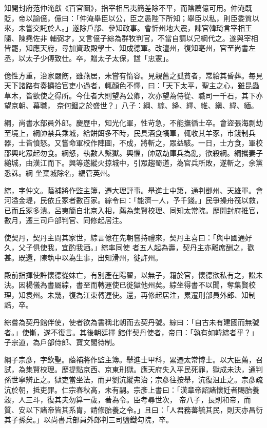 \begin{pinyinscope}
 知開封府范仲淹獻《百官圖》，指宰相呂夷簡差除不平，而陰薦億可用。仲淹既貶，帝以諭億，億曰：「仲淹舉臣以公，臣之愚陛下所知；舉臣以私，則臣委質以來，未嘗交託於人。」遂除戶部、參知政事。會忻州地大震，諫官韓琦言宰相王隨、陳堯佐非
 輔弼才，又言億子綜為群牧判官，不當自請以兄綱代之。遂與宰相皆罷，知應天府，尋加資政殿學士、知成德軍。改澶州，復知亳州，官至尚書左丞，以太子少傅致仕。卒，贈太子太保，諡「忠憲」。



 億性方重，治家嚴飭，雖燕居，未嘗有惰容。見親舊之孤貧者，常給其昏葬。每見天下諸路有奏攟拾官吏小過者，輒顏色不懌，曰：「天下太平，聖主之心，雖昆蟲草木，皆欲使之得所。今仕者大則望為公卿，次亦望為侍從、職司一千石，其下亦望京朝、幕職，
 奈何錮之於盛世？」八子：綱、綜、絳、繹、維、縝、緯、緬。



 綱，尚書水部員外郎。慶歷中，知光化軍，性苛急，不能撫循士卒。會盜張海剽劫至境上，綱帥禁兵乘城，給餅餌多不時，民具酒食犒軍，輒收其羊豕，市錢制兵器，士皆憤怒。又嘗命軍校作陣圖，不成，將斬之，眾益駭。一日，士方食，軍校邵興叱眾起勿食。綱怒，執數人繫獄。興懼，帥眾劫庫兵為亂，欲殺綱。綱攜妻子縋城，由漢江而下。興等遂縱火掠城中，引眾趨蜀道，為官兵所敗，遂斬之，余黨悉誅。綱
 坐棄城除名，編管英州。



 綜，字仲文。蔭補將作監主簿，遷大理評事。舉進士中第，通判鄧州、天雄軍。會河溢金堤，民依丘冢者數百家。綜令曰：「能濟一人，予千錢。」民爭操舟筏以救，已而丘冢多潰。呂夷簡自北京入相，薦為集賢校理、同知太常院。歷開封府推官，數月，遷三司戶部判官、同修起居注。



 使契丹，契丹主問其家世，綜言億在先朝嘗持禮來，契丹主喜曰：「與中國通好久，父子俱使我，宜酌我酒。」綜率同使
 者五人起為壽，契丹主亦離席酬之，歡甚。既還，陳執中以為生事，出知滑州，徙許州。



 殿前指揮使許懷德從妹亡，有別產在陽翟，以無子，籍於官，懷德欲私有之，訟未決。因楊儀為書屬綜，書至而轉運使已徙獄他州矣。綜坐得書不以聞，奪集賢校理，知袁州。未幾，復為江東轉運使。還，再修起居注，累遷刑部員外郎、知制誥，卒。



 綜嘗為契丹館伴使，使者欲為書稱北朝而去契丹號。綜曰：「自古未有建國而無號者。」使慚，遂不復言。其後朝廷擇
 館伴契丹使者，帝曰：「孰有如韓綜者乎？」子宗道，為戶部侍郎、寶文閣待制。



 綱子宗彥，字欽聖。蔭補將作監主簿。舉進士甲科，累遷太常博士。以大臣薦，召試，為集賢校理。歷提點京西、京東刑獄。應天府失入平民死罪，獄成未決，通判孫世寧辨正之。獄吏當坐法，而尹劉沆縱弗治；宗彥往按舉，沆復沮止之。宗彥疏沆於朝，抵吏罪。仁宗春秋高，未有嗣。宗彥上書曰：「漢章帝詔諸懷妊者賜胎養穀，人三斗，復其夫勿算一歲，著為令。臣考尋世次，
 帝八子，長則和帝，而質、安以下諸帝皆其系胄，請修胎養之令。」且曰：「人君務蕃毓其民，則天亦昌衍其子孫矣。」以尚書兵部員外郎判三司鹽鐵勾院，卒。




\end{pinyinscope}
